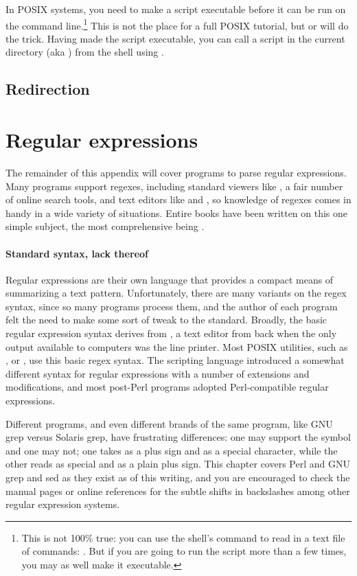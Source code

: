In POSIX systems, you need to make a script executable before it can be
run on the command line.\footnote{This is not 100\% true: you can use
the shell's  command to read in a text file of commands:
. But if you are going to run the script more than a
few times, you may as well make it executable.} This is not the place
for a full POSIX tutorial, but  or  will do the trick. Having made the script executable, you
can call a script in the current directory (aka ) from the shell
using .

\subsection{Redirection} 

\section{Regular expressions}
The remainder of this appendix will cover programs to parse regular
expressions.  Many programs support regexes, including standard viewers
like , a fair number of online search tools, and text editors
like  and , so knowledge of regexes comes in handy
in a wide variety of situations. Entire books have been written on this
one simple subject, the most comprehensive being \citet{friedl:regex}.

\paragraph{Standard syntax, lack thereof} Regular expressions are
their own language that provides a compact means of summarizing a text
pattern. Unfortunately, there are many variants on the regex syntax,
since so many programs process them, and the author of each program felt
the need to make some sort of tweak to the standard.  Broadly, the basic
regular expression syntax derives from , a text editor from back
when the only output available to computers was the line printer. Most
POSIX utilities, such as ,  or ,
use this basic regex syntax. The scripting language 
introduced a somewhat different syntax for regular expressions with
a number of extensions and modifications, and most post-Perl programs
adopted Perl-compatible regular expressions.

Different programs, and even different brands of the same
program, like GNU grep versus Solaris grep, have frustrating
differences: one may support the  symbol and one may not; 
one takes \ci{+} as a plus sign and  \ci{\textbs+} as a special
character, while the other reads \ci{+} as special and \ci{\textbs+}
as a plain plus sign. This chapter covers Perl and GNU grep and sed as they exist as
of this writing, and you are encouraged to check the manual pages or
online references for the subtle shifts in backslashes among other
regular expression systems.


